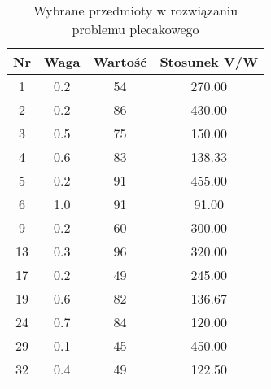\begin{table}[h!]
\centering
\begin{tabular}{|c|c|c|c|}
\hline
Nr & Waga & Wartość & Stosunek V/W \\
\hline
1 & 0.2 & 54 & 270.00 \\
2 & 0.2 & 86 & 430.00 \\
3 & 0.5 & 75 & 150.00 \\
4 & 0.6 & 83 & 138.33 \\
5 & 0.2 & 91 & 455.00 \\
6 & 1.0 & 91 & 91.00 \\
9 & 0.2 & 60 & 300.00 \\
13 & 0.3 & 96 & 320.00 \\
17 & 0.2 & 49 & 245.00 \\
19 & 0.6 & 82 & 136.67 \\
24 & 0.7 & 84 & 120.00 \\
29 & 0.1 & 45 & 450.00 \\
32 & 0.4 & 49 & 122.50 \\
\hline
\end{tabular}
\caption{Wybrane przedmioty w rozwiązaniu problemu plecakowego}
\label{tab:selected_items}
\end{table}
